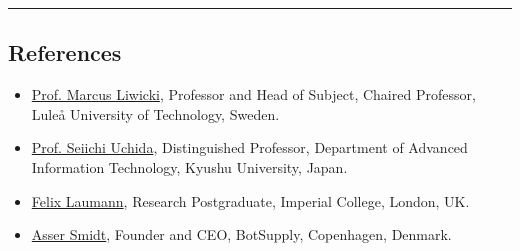 \documentclass[10pt,letterpaper]{article}
\begin{document}
\hrule
\vspace{-0.4em}
\subsection*{\color{MidnightBlue}References}

\begin{itemize}
	\parskip=0.1em

    \item \href{https://www.ltu.se/staff/m/marliw-1.177225?l=en}{\color{BrickRed} Prof. Marcus Liwicki}, Professor and Head of Subject, Chaired Professor, Luleå University of Technology, Sweden. 
    
    \item \href{http://human.ait.kyushu-u.ac.jp/~uchida/index-e.html}{\color{BrickRed} Prof. Seiichi Uchida}, Distinguished Professor, Department of Advanced Information Technology, Kyushu University, Japan. 
    
    \item \href{https://www.imperial.ac.uk/people/f.laumann18}{\color{BrickRed} Felix Laumann}, Research Postgraduate, Imperial College, London, UK.
    
    \item \href{https://www.linkedin.com/in/assersmidt/}{\color{BrickRed} Asser Smidt}, Founder and CEO, BotSupply, Copenhagen, Denmark.
    

\end{itemize}
\end{document}
